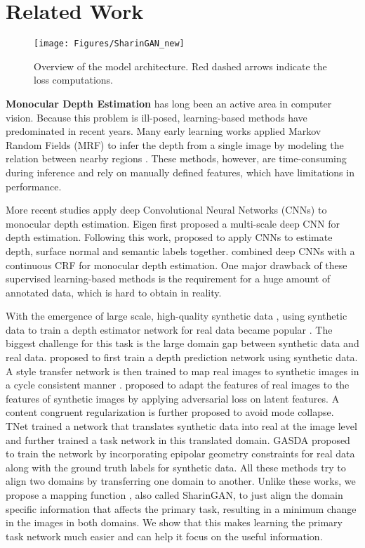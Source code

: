\documentclass[10pt,twocolumn,letterpaper]{article}
\begin{document}
\section{Related Work}
\begin{figure*}
    \centering
  \texttt{[image: Figures/SharinGAN\_new]}
    \caption{Overview of the model architecture. Red dashed arrows indicate the loss computations.}
\label{fig:SharinGAN}
\end{figure*}
\textbf{Monocular Depth Estimation} has long been an active area in computer vision.  Because this problem is ill-posed, learning-based methods have predominated in recent years.
Many early learning works applied Markov Random Fields (MRF) to infer the depth from a single image by modeling the relation between nearby regions \cite{Saxena2006,make3D,Liu_2014_CVPR}.
These methods, however, are time-consuming during inference and rely on manually defined features, which have limitations in performance.

More recent studies apply deep Convolutional Neural Networks (CNNs) \cite{Eigen2014,NYUv2,Fayao,Lei,Xu_2018_CVPR,repala2018dual,Qi_2018_CVPR,Roy_2016_CVPR} to monocular depth estimation.
Eigen \etal \cite{Eigen2014} first proposed a multi-scale deep CNN for depth estimation.
Following this work, \cite{NYUv2} proposed to apply CNNs to estimate depth, surface normal and semantic labels together.
\cite{Fayao} combined deep CNNs with a continuous CRF for monocular depth estimation.
One major drawback of these supervised learning-based methods is the requirement for a huge amount of annotated data, which is hard to obtain in reality.

With the emergence of large scale, high-quality synthetic data \cite{vKITTI}, using synthetic data to train a depth estimator network for real data became popular \cite{T2NET,GASDA}.
The biggest challenge for this task is the large domain gap between synthetic data and real data.
\cite{Amir2018} proposed to first train a depth prediction network using synthetic data.
A style transfer network is then trained to map real images to synthetic images in a cycle consistent manner \cite{CycleGAN2017}.
\cite{adaDepth} proposed to adapt the features of real images to the features of synthetic images by applying adversarial loss on latent features. 
A content congruent regularization is further proposed to avoid mode collapse.
TNet \cite{T2NET} trained a network that translates synthetic data into real at the image level and further trained a task network in this translated domain.
GASDA \cite{GASDA} proposed to train the network by incorporating epipolar geometry constraints for real data along with the ground truth labels for synthetic data.
All these methods try to align two domains by transferring one domain to another. Unlike these works, we propose a mapping function , also called SharinGAN, to just align the domain specific information that affects the primary task, resulting in a minimum change in the images in both domains. 
We show that this makes learning the primary task network much easier and can help it focus on the useful information.
\end{document}
